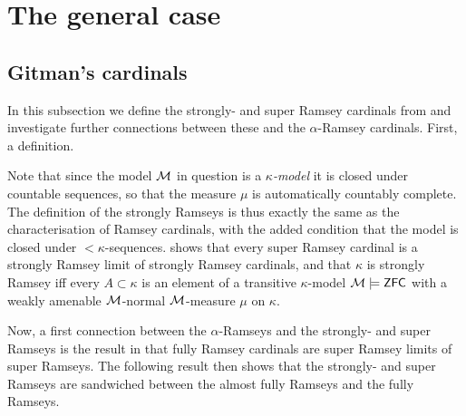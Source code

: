 \documentclass[../../main]{subfiles}
\begin{document}
\section{The general case}

\subsection{Gitman's cardinals}

In this subsection we define the strongly- and super Ramsey cardinals from \cite{Ramsey1} and investigate further connections between these and the $\alpha$-Ramsey cardinals. First, a definition.


Note that since the model $\operatorname{\mathcal M}$ in question is a \textit{$\kappa$-model} it is closed under countable sequences, so that the measure $\mu$ is automatically countably complete. The definition of the strongly Ramseys is thus exactly the same as the characterisation of Ramsey cardinals, with the added condition that the model is closed under ${<}\kappa$-sequences. \cite{Ramsey1} shows that every super Ramsey cardinal is a strongly Ramsey limit of strongly Ramsey cardinals, and that $\kappa$ is strongly Ramsey iff every $A\subset\kappa$ is an element of a transitive $\kappa$-model $\operatorname{\mathcal M}\models\textsf{ZFC}$ with a weakly amenable $\operatorname{\mathcal M}$-normal $\operatorname{\mathcal M}$-measure $\mu$ on $\kappa$.

\qquad Now, a first connection between the $\alpha$-Ramseys and the strongly- and super Ramseys is the result in \cite{HolySchlicht} that fully Ramsey cardinals are super Ramsey limits of super Ramseys. The following result then shows that the strongly- and super Ramseys are sandwiched between the almost fully Ramseys and the fully Ramseys.
\end{document}

